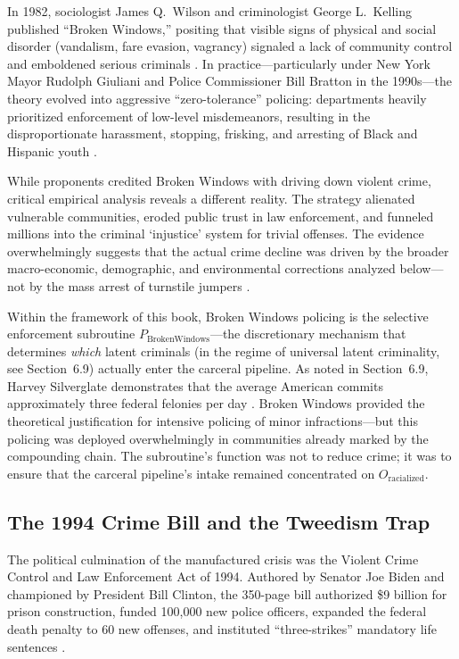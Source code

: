 \documentclass[12pt,openany]{book}
\begin{document}
In 1982, sociologist James Q.\ Wilson and criminologist George L.\ Kelling published ``Broken Windows,'' positing that visible signs of physical and social disorder (vandalism, fare evasion, vagrancy) signaled a lack of community control and emboldened serious criminals \cite{wilson}. In practice---particularly under New York Mayor Rudolph Giuliani and Police Commissioner Bill Bratton in the 1990s---the theory evolved into aggressive ``zero-tolerance'' policing: departments heavily prioritized enforcement of low-level misdemeanors, resulting in the disproportionate harassment, stopping, frisking, and arresting of Black and Hispanic youth \cite{harcourt}.

While proponents credited Broken Windows with driving down violent crime, critical empirical analysis reveals a different reality. The strategy alienated vulnerable communities, eroded public trust in law enforcement, and funneled millions into the criminal `injustice' system for trivial offenses. The evidence overwhelmingly suggests that the actual crime decline was driven by the broader macro-economic, demographic, and environmental corrections analyzed below---not by the mass arrest of turnstile jumpers \cite{brennan_decline}.

Within the framework of this book, Broken Windows policing is the selective enforcement subroutine $P_{\text{BrokenWindows}}$---the discretionary mechanism that determines \textit{which} latent criminals (in the regime of universal latent criminality, see Section~6.9) actually enter the carceral pipeline. As noted in Section~6.9, Harvey Silverglate demonstrates that the average American commits approximately three federal felonies per day \cite{silverglate}. Broken Windows provided the theoretical justification for intensive policing of minor infractions---but this policing was deployed overwhelmingly in communities already marked by the compounding chain. The subroutine's function was not to reduce crime; it was to ensure that the carceral pipeline's intake remained concentrated on $O_{\text{racialized}}$.

\subsection{The 1994 Crime Bill and the Tweedism Trap}

The political culmination of the manufactured crisis was the Violent Crime Control and Law Enforcement Act of 1994. Authored by Senator Joe Biden and championed by President Bill Clinton, the 350-page bill authorized \$9 billion for prison construction, funded 100,000 new police officers, expanded the federal death penalty to 60 new offenses, and instituted ``three-strikes'' mandatory life sentences \cite{forman}.
\end{document}
